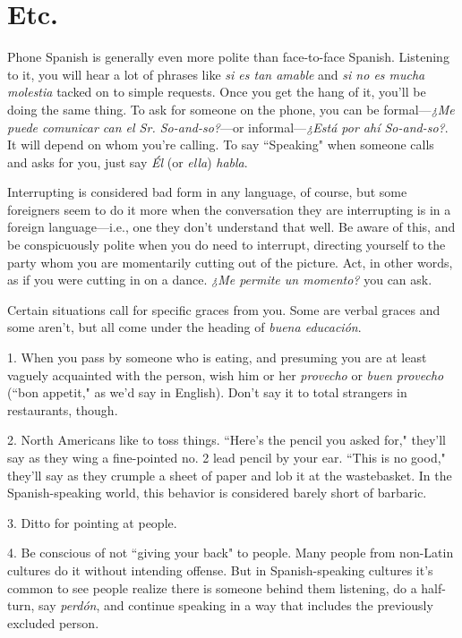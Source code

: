 \section{Etc.}

Phone Spanish is generally even more polite than face-to-face
Spanish. Listening to it, you will hear a lot of phrases like \emph{si es tan
	amable} and \emph{si no es mucha molestia} tacked on to simple requests.
Once you get the hang of it, you'll be doing the same thing. To ask for
someone on the phone, you can be formal---\emph{¿Me puede comunicar can
	el Sr. So-and-so?}---or informal---\emph{¿Está por ahí So-and-so?}. It will depend on whom you're calling. To say ``Speaking" when someone calls
and asks for you, just say \emph{Él} (or \emph{ella}) \emph{habla}.

Interrupting is considered bad form in any language, of course,
but some foreigners seem to do it more when the conversation they are
interrupting is in a foreign language---i.e., one they don't understand
that well. Be aware of this, and be conspicuously polite when you do
need to interrupt, directing yourself to the party whom you are momentarily cutting out of the picture. Act, in other words, as if you were
cutting in on a dance. \emph{¿Me permite un momento?} you can ask.

Certain situations call for specific graces from you. Some are
verbal graces and some aren't, but all come under the heading of \emph{buena educación}.

\bsk

1. When you pass by someone who is eating, and presuming
you are at least vaguely acquainted with the person, wish him or her
\emph{provecho} or \emph{buen provecho} (``bon appetit," as we'd say in English).
Don't say it to total strangers in restaurants, though.

2. North Americans like to toss things. ``Here's the pencil you
asked for," they'll say as they wing a fine-pointed no. 2 lead pencil by
your ear. ``This is no good," they'll say as they crumple a sheet of paper
and lob it at the wastebasket. In the Spanish-speaking world, this behavior is considered barely short of barbaric.

3. Ditto for pointing at people.

4. Be conscious of not ``giving your back" to people. Many
people from non-Latin cultures do it without intending offense. But in
Spanish-speaking cultures it's common to see people realize there is
someone behind them listening, do a half-turn, say \emph{perdón}, and continue speaking in a way that includes the previously excluded person.

